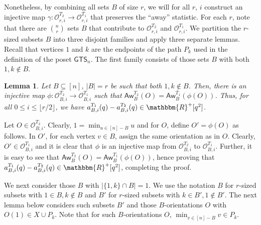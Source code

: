 \documentclass[12pt]{article}
\def\eod{\vrule height 6pt width 5pt depth 0pt}
\newenvironment{proof}{\noindent {\bf Proof:} \hspace{.2em}}
                      {\hspace*{\fill}{\eod}}
\newtheorem{lemma}[theorem]{Lemma}
\newcommand{\sO}{  \mathcal{ O}}
\newcommand{\RR}{ \mathbbm{R}}
\newcommand{\rhalf}{\lfloor r/2 \rfloor}
\newcommand{\GTS}{\mathsf{GTS}}
\newcommand{\awy}{\mathsf{Aw}}
\begin{document}
Nonetheless, by combining all sets $B$ of size $r$, we will for all $r$, $i$ 
construct an injective map $\gamma : \sO_{r,i}^{T_2} \rightarrow \sO_{r,i}^{T_1}$ 
that preserves the ``away'' statistic.  
For each $r$, note that there are $\binom{n}{r}$ sets $B$ that 
contribute to $\sO_{r,i}^{T_2}$ and $\sO_{r,i}^{T_1}$.
We partition the $r$-sized subsets $B$ into three disjoint 
families and apply three separate lemmas.
Recall that vertices $1$ and $k$ are the endpoints of the path $P_k$ used
in the definition of the poset $\GTS_n$.
The first family consists of those sets $B$ with both
$1,k \not\in B$. 
\begin{lemma}
\label{lem:1_and_k_not_in_O}
Let $B \subseteq [n]$, $|B| = r$ be such that both $1,k \not \in B$.  
Then, there is an injective map $\phi: \sO_{B,i}^{T_2} \rightarrow 
\sO_{B,i}^{T_1}$ such that $\awy_B^{T_2}(O) = \awy_B^{T_1}(\phi(O))$.  
Thus, for all $0 \leq i \leq \rhalf$, 
we have $a_{B,i}^{T_1}(q) - a_{B,i}^{T_2}(q) \in \RR^+[q^2]$.
\end{lemma}
\begin{proof}
  Let $O \in \sO_{B,i}^{T_2}$.  Clearly, $1= \min_{u \in [n]-B}^{ } u$ and
for $O$, define $O' = \phi(O)$ as follows.  In $O'$, for each vertex
$v \in B$, assign the same orientation as in $O$.  Clearly, 
$O' \in \sO_{B,i}^{T_1}$  and it is clear that $\phi$ is  
an injective map from $\sO_{B,i}^{T_2}$ to $\sO_{B,i}^{T_1}$.
Further, it is easy to see that $\awy_B^{T_2}(O) = \awy_B^{T_1}(\phi(O))$, hence 
proving that $a_{B,i}^{T_1}(q) - a_{B,i}^{T_2}(q) \in \RR^+[q^2]$, completing the proof.
\end{proof}

\vspace{2 mm}

We next consider those $B$ with $|\{1,k\} \cap B| = 1$.  We use the 
notation $B$ for $r$-sized subsets with $1 \in B, k \not\in B$ and 
$B'$ for $r$-sized subsets with $k \in B', 1 \not\in B'$.  
The next lemma below considers such subsets $B'$ and those 
$B$-orientations $O$ with $O(1) \in X \cup P_k$.  Note that
for such $B$-orientations $O$, $\min_{v \in [n]-B}^{ }v \in P_k$.
\end{document}
